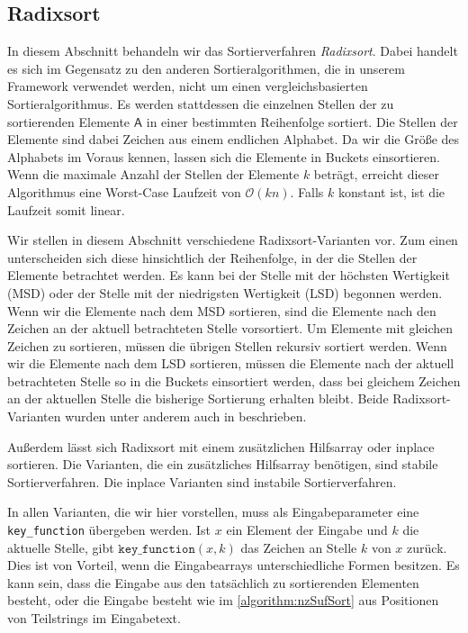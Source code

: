 \subsection{Radixsort}
\label{sort:radix}


In  diesem Abschnitt behandeln wir das Sortierverfahren \emph{Radixsort}.
Dabei handelt es sich im Gegensatz zu den anderen Sortieralgorithmen, die in unserem Framework verwendet werden,
nicht um einen vergleichsbasierten Sortieralgorithmus.
Es werden stattdessen die einzelnen Stellen der zu sortierenden Elemente $\mathsf{A}$ in einer bestimmten Reihenfolge sortiert.
Die Stellen der Elemente sind dabei Zeichen aus einem endlichen Alphabet.
Da wir die Größe des Alphabets im Voraus kennen, lassen sich die Elemente in Buckets einsortieren.
Wenn die maximale Anzahl der Stellen der Elemente $k$ beträgt,
erreicht dieser Algorithmus eine Worst-Case Laufzeit von $\mathcal O(kn)$.
Falls $k$ konstant ist, ist die Laufzeit somit linear.

Wir stellen in diesem Abschnitt verschiedene Radixsort-Varianten vor.
Zum einen unterscheiden sich diese hinsichtlich der Reihenfolge,
in der die Stellen der Elemente betrachtet werden.
Es kann bei der Stelle mit der höchsten Wertigkeit (MSD) oder der Stelle mit der niedrigsten Wertigkeit (LSD) begonnen werden.
Wenn wir die Elemente nach dem MSD sortieren, sind die Elemente nach den Zeichen an der aktuell betrachteten Stelle vorsortiert.
Um Elemente mit gleichen Zeichen zu sortieren, müssen die übrigen Stellen rekursiv sortiert werden.
Wenn wir die Elemente nach dem LSD sortieren,
müssen die Elemente nach der aktuell betrachteten Stelle so in die Buckets einsortiert werden,
dass bei gleichem Zeichen an der aktuellen Stelle die bisherige Sortierung erhalten bleibt.
Beide Radixsort-Varianten wurden unter anderem auch in \cite{Cormen2009} beschrieben.

Außerdem lässt sich Radixsort mit einem zusätzlichen Hilfsarray oder inplace sortieren.
Die Varianten, die ein zusätzliches Hilfsarray benötigen, sind stabile Sortierverfahren.
Die inplace Varianten sind instabile Sortierverfahren.

In allen Varianten, die wir hier vorstellen,
muss als Eingabeparameter eine \texttt{key\_function} übergeben werden.
Ist $x$ ein Element der Eingabe und $k$ die aktuelle Stelle, gibt $\texttt{key\_function}(x,k)$ das Zeichen an Stelle $k$ von $x$ zurück.
Dies ist von Vorteil, wenn die Eingabearrays unterschiedliche Formen besitzen.
Es kann sein, dass die Eingabe aus den tatsächlich zu sortierenden Elementen besteht,
oder die Eingabe besteht wie im \cref{algorithm:nzSufSort} aus Positionen von Teilstrings im Eingabetext.

